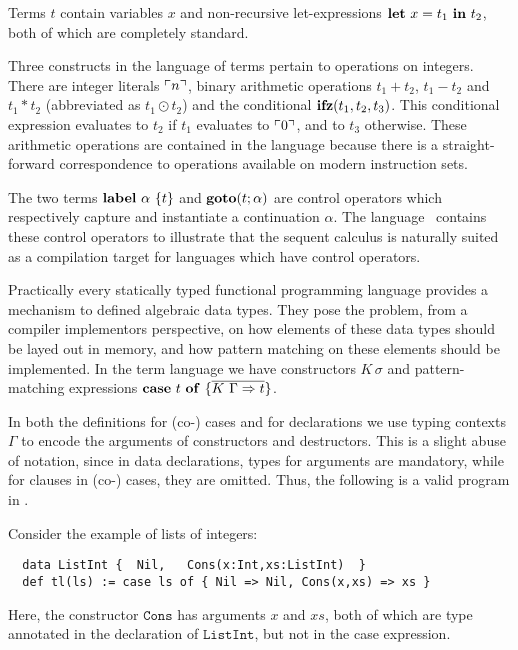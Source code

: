 Terms $t$ contain variables $x$ and non-recursive let-expressions $\mathbf{let}\ x = t_1\ \mathbf{in}\ t_2$, both of which are completely standard.

Three constructs in the language of terms pertain to operations on integers.
There are integer literals $\ulcorner n \urcorner$, binary arithmetic operations $t_1 + t_2$, $t_1 - t_2$ and $t_1 * t_2$ (abbreviated as $t_1 \odot t_2$) and the conditional $\mathbf{ifz}(t_1, t_2, t_3)$.
This conditional expression evaluates to $t_2$ if $t_1$ evaluates to $\ulcorner 0 \urcorner$, and to $t_3$ otherwise.
These arithmetic operations are contained in the language because there is a straight-forward correspondence to operations available on modern instruction sets.

The two terms $\mathbf{label}\ \alpha\ \{t \}$ and $\mathbf{goto}(t; \alpha)$ are control operators which respectively capture and instantiate a continuation $\alpha$.
The language \surfacelang\ contains these control operators to illustrate that the sequent calculus is naturally suited as a compilation target for languages which have control operators.

Practically every statically typed functional programming language provides a mechanism to defined algebraic data types.
They pose the problem, from a compiler implementors perspective, on how elements of these data types should be layed out in memory, and how pattern matching on these elements should be implemented.
In the term language we have constructors $K\, \sigma$ and pattern-matching expressions $\mathbf{case}\ t\ \mathbf{of}\ \{ \overline{K\ \Gamma \Rightarrow t} \}$.

In both the definitions for (co-) cases and for declarations we use typing contexts $\Gamma$ to encode the arguments of constructors and destructors.
This is a slight abuse of notation, since in data declarations, types for arguments are mandatory, while for clauses in (co-) cases, they are omitted.
Thus, the following is a valid program in \surfacelang{}.
\begin{example}
  \label{ex:fun-syntax}
  Consider the example of lists of integers:
  \begin{lstlisting}
  data ListInt {  Nil,   Cons(x:Int,xs:ListInt)  }
  def tl(ls) := case ls of { Nil => Nil, Cons(x,xs) => xs }
  \end{lstlisting}
  Here, the constructor $\mathtt{Cons}$ has arguments $x$ and $xs$, both of which are type annotated in the declaration of $\mathtt{ListInt}$, but not in the case expression.
\end{example}

